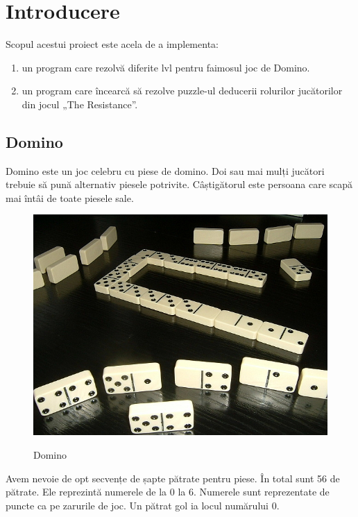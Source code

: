 \section{Introducere}

Scopul acestui proiect este acela de a implementa:
\begin{enumerate}
    \item un program care rezolvă diferite lvl pentru faimosul joc de Domino.
    \item un program care încearcă să rezolve puzzle-ul deducerii rolurilor jucătorilor din jocul „The Resistance”.
\end{enumerate} 
\newline
\subsection{Domino}

Domino este un joc celebru cu piese de domino. Doi sau mai mulți jucători trebuie să pună alternativ piesele potrivite. Câștigătorul este persoana care scapă mai întâi de toate piesele sale.
\newline
\newline
\begin{figure}[h]
    \centering
    \includegraphics[width=16cm]{text/images/pic1.jpg}\\
    \caption{Domino}
\end{figure}

Avem nevoie de opt secvențe de șapte pătrate pentru piese. În total sunt 56 de pătrate. Ele reprezintă numerele de la 0 la 6. Numerele sunt reprezentate de puncte ca pe zarurile de joc. Un pătrat gol ia locul numărului 0.

